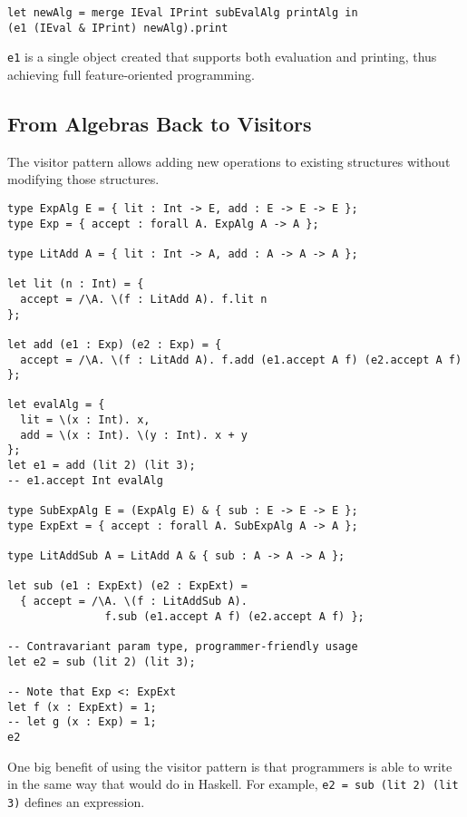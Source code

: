 \documentclass[preprint]{sigplanconf}
\begin{document}
\begin{verbatim}
let newAlg = merge IEval IPrint subEvalAlg printAlg in
(e1 (IEval & IPrint) newAlg).print
\end{verbatim}

\lstinline{e1} is a single object created that supports both evaluation and
printing, thus achieving full feature-oriented programming.

\subsection{From Algebras Back to Visitors}

The visitor pattern allows adding new operations to existing structures without
modifying those structures.

\begin{verbatim}
type ExpAlg E = { lit : Int -> E, add : E -> E -> E };
type Exp = { accept : forall A. ExpAlg A -> A };

type LitAdd A = { lit : Int -> A, add : A -> A -> A };

let lit (n : Int) = {
  accept = /\A. \(f : LitAdd A). f.lit n
};

let add (e1 : Exp) (e2 : Exp) = {
  accept = /\A. \(f : LitAdd A). f.add (e1.accept A f) (e2.accept A f)
};

let evalAlg = {
  lit = \(x : Int). x,
  add = \(x : Int). \(y : Int). x + y
};
let e1 = add (lit 2) (lit 3);
-- e1.accept Int evalAlg

type SubExpAlg E = (ExpAlg E) & { sub : E -> E -> E };
type ExpExt = { accept : forall A. SubExpAlg A -> A };

type LitAddSub A = LitAdd A & { sub : A -> A -> A };

let sub (e1 : ExpExt) (e2 : ExpExt) =
  { accept = /\A. \(f : LitAddSub A).
               f.sub (e1.accept A f) (e2.accept A f) };

-- Contravariant param type, programmer-friendly usage
let e2 = sub (lit 2) (lit 3);

-- Note that Exp <: ExpExt
let f (x : ExpExt) = 1;
-- let g (x : Exp) = 1;
e2
\end{verbatim}

One big benefit of using the visitor pattern is that programmers is able to
write in the same way that would do in Haskell. For example,
\lstinline{e2 = sub (lit 2) (lit 3)}
defines an expression.
\end{document}
